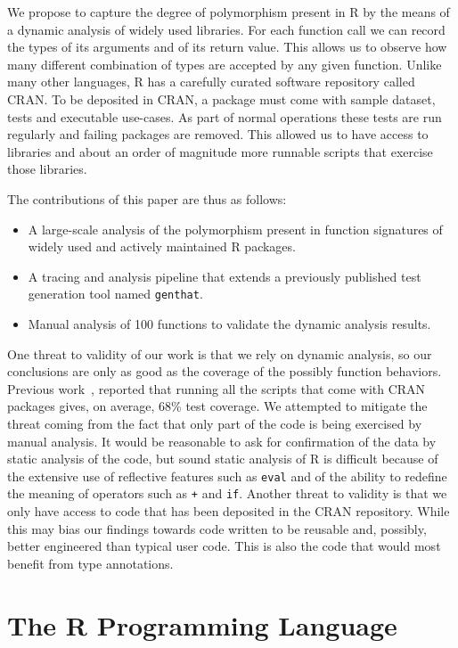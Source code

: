 \documentclass[acmsmall,10pt,review,anonymous]{acmart}\settopmatter{printfolios=true,printccs=false,printacmref=false}
\newcommand{\code}[1]{\lstinline|#1|\xspace}
\begin{document}
We propose to capture the degree of polymorphism present in R by the means
of a dynamic analysis of widely used libraries. For each function call we
can record the types of its arguments and of its return value. This allows
us to observe how many different combination of types are accepted by any
given function. Unlike many other languages, R has a carefully curated
software repository called CRAN. To be deposited in CRAN, a package must
come with sample dataset, tests and executable use-cases. As part of normal
operations these tests are run regularly and failing packages are removed.
This allowed us to have access to \PACKAGES libraries and about an order of
magnitude more runnable scripts that exercise those libraries.

The contributions of this paper are thus as follows:
\begin{itemize}
\item A large-scale analysis of the polymorphism present in function
  signatures of \PACKAGES widely used and actively maintained R packages.
\item A tracing and analysis pipeline that extends a previously published
  test generation tool named \code{genthat}.
\item Manual analysis of 100 functions to validate the dynamic analysis
  results.
\end{itemize}

One threat to validity of our work is that we rely on dynamic analysis, so
our conclusions are only as good as the coverage of the possibly function
behaviors. Previous work~\cite{issta18}, reported that running all the
scripts that come with CRAN packages gives, on average, 68\% test coverage.
We attempted to mitigate the threat coming from the fact that only part of
the code is being exercised by manual analysis. It would be reasonable to
ask for confirmation of the data by static analysis of the code, but sound
static analysis of R is difficult because of the extensive use of reflective
features such as \code{eval} and of the ability to redefine the meaning of
operators such as \code{+} and \code{if}.  Another threat to validity is
that we only have access to code that has been deposited in the CRAN
repository. While this may bias our findings towards code written to be
reusable and, possibly, better engineered than typical user code. This is
also the code that would most benefit from type annotations.

\newpage  %

\section{The R Programming Language}\label{sec:rlang}
\end{document}
